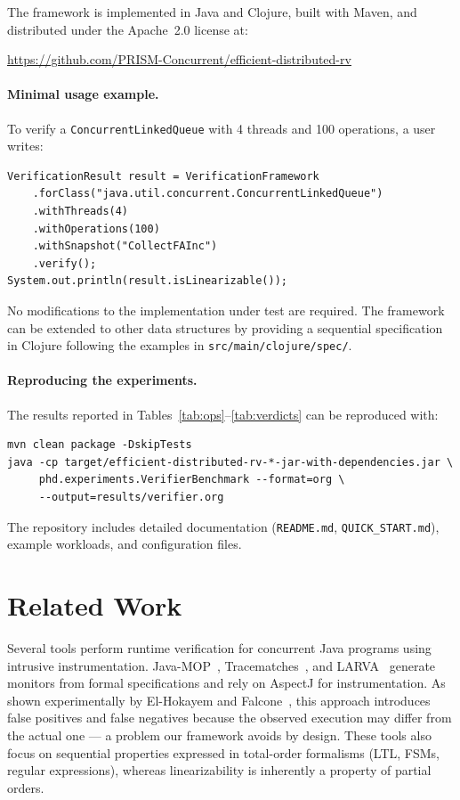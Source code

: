 \documentclass[preprint,12pt]{elsarticle}
\begin{document}
The framework is implemented in Java and Clojure, built with Maven,
and distributed under the Apache~2.0 license at:
\begin{center}
\url{https://github.com/PRISM-Concurrent/efficient-distributed-rv}
\end{center}

\paragraph{Minimal usage example.}
To verify a \texttt{ConcurrentLinkedQueue} with 4 threads and
100 operations, a user writes:

\begin{verbatim}
VerificationResult result = VerificationFramework
    .forClass("java.util.concurrent.ConcurrentLinkedQueue")
    .withThreads(4)
    .withOperations(100)
    .withSnapshot("CollectFAInc")
    .verify();
System.out.println(result.isLinearizable());
\end{verbatim}

No modifications to the implementation under test are required.
The framework can be extended to other data structures by providing
a sequential specification in Clojure following the examples in
\texttt{src/main/clojure/spec/}.

\paragraph{Reproducing the experiments.}
The results reported in Tables~\ref{tab:ops}--\ref{tab:verdicts}
can be reproduced with:

\begin{verbatim}
mvn clean package -DskipTests
java -cp target/efficient-distributed-rv-*-jar-with-dependencies.jar \
     phd.experiments.VerifierBenchmark --format=org \
     --output=results/verifier.org
\end{verbatim}

The repository includes detailed documentation
(\texttt{README.md}, \texttt{QUICK\_START.md}),
example workloads, and configuration files.

\section{Related Work}
\label{sec:related}

Several tools perform runtime verification for concurrent Java programs using
intrusive instrumentation. Java-MOP~\cite{CR05}, Tracematches~\cite{BHL10},
and LARVA~\cite{CPS09} generate monitors from formal specifications and rely
on AspectJ for instrumentation. As shown experimentally by El-Hokayem and
Falcone~\cite{E-HF18}, this approach introduces false positives and false
negatives because the observed execution may differ from the actual one ---
a problem our framework avoids by design. These tools also focus on
sequential properties expressed in total-order formalisms (LTL, FSMs, regular
expressions), whereas linearizability is inherently a property of partial
orders.
\end{document}

